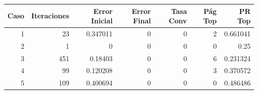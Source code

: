 \begin{tabular}{rrrrrrr}
\toprule
   Caso &   Iteraciones &   Error Inicial &   Error Final &   Tasa Conv &   Pág Top &   PR Top \\
\midrule
      1 &            23 &        0.347011 &             0 &           0 &         2 & 0.661041 \\
      2 &             1 &        0        &             0 &           0 &         0 & 0.25     \\
      3 &           451 &        0.18403  &             0 &           0 &         6 & 0.231324 \\
      4 &            99 &        0.120208 &             0 &           0 &         3 & 0.370572 \\
      5 &           109 &        0.400694 &             0 &           0 &         0 & 0.486486 \\
\bottomrule
\end{tabular}